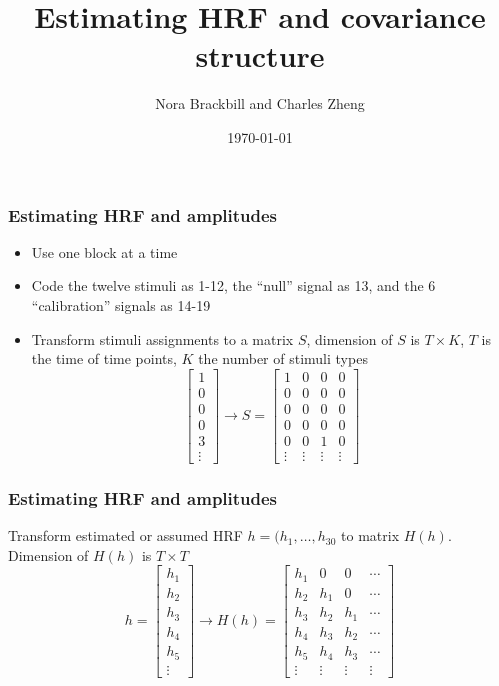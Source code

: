 \documentclass{beamer}
\title[Exercise 2]{Estimating HRF and covariance structure}
\author{Nora Brackbill and Charles Zheng} %
\institute[Stanford] %
{Stanford University}
\date{\today} %
\begin{document}
\begin{frame}
\titlepage %
\end{frame}


\begin{frame}
\frametitle{Estimating HRF and amplitudes}
\begin{itemize}
\item Use one block at a time
\item Code the twelve stimuli as 1-12, the ``null'' signal as 13, and the 6 ``calibration'' signals as 14-19
\item Transform stimuli assignments to a matrix $S$,
dimension of $S$ is $T \times K$, $T$ is the time of time points, $K$ the number of stimuli types
\[
\begin{bmatrix}
1\\0\\0\\0\\3\\\vdots
\end{bmatrix} \rightarrow
S = 
\begin{bmatrix}
1 & 0 & 0 & 0\\
0 & 0 & 0 & 0\\
0 & 0 & 0 & 0\\
0 & 0 & 0 & 0\\
0 & 0 & 1 & 0\\
\vdots & \vdots & \vdots & \vdots
\end{bmatrix}
\]
\end{itemize}
\end{frame}


\begin{frame}
\frametitle{Estimating HRF and amplitudes}
Transform estimated or assumed HRF $h = (h_1,\hdots,h_{30}$ to matrix $H(h)$.
Dimension of $H(h)$ is $T \times T$
\[
h = 
\begin{bmatrix}
h_1\\h_2\\h_3\\h_4\\h_5\\\vdots
\end{bmatrix} \rightarrow
H(h) = 
\begin{bmatrix}
h_1 & 0 & 0 & \cdots\\
h_2 & h_1 & 0 & \cdots\\
h_3 & h_2 & h_1 & \cdots\\
h_4 & h_3 & h_2 & \cdots\\
h_5 & h_4 & h_3 & \cdots\\
\vdots & \vdots & \vdots & \vdots
\end{bmatrix}
\]

\end{frame}
\end{document}
